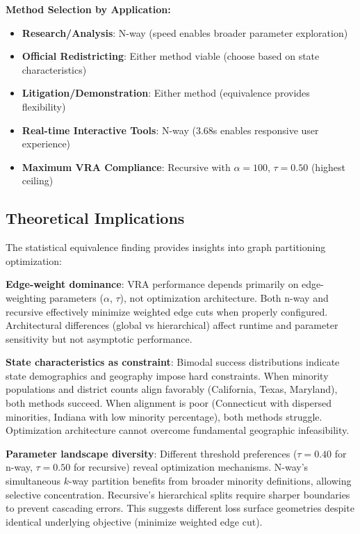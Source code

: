 \textbf{Method Selection by Application:}
\begin{itemize}
\item \textbf{Research/Analysis}: N-way (speed enables broader parameter exploration)
\item \textbf{Official Redistricting}: Either method viable (choose based on state characteristics)
\item \textbf{Litigation/Demonstration}: Either method (equivalence provides flexibility)
\item \textbf{Real-time Interactive Tools}: N-way (3.68s enables responsive user experience)
\item \textbf{Maximum VRA Compliance}: Recursive with $\alpha=100$, $\tau=0.50$ (highest ceiling)
\end{itemize}

\subsection{Theoretical Implications}

The statistical equivalence finding provides insights into graph partitioning optimization:

\textbf{Edge-weight dominance}: VRA performance depends primarily on edge-weighting parameters ($\alpha$, $\tau$), not optimization architecture. Both n-way and recursive effectively minimize weighted edge cuts when properly configured. Architectural differences (global vs hierarchical) affect runtime and parameter sensitivity but not asymptotic performance.

\textbf{State characteristics as constraint}: Bimodal success distributions indicate state demographics and geography impose hard constraints. When minority populations and district counts align favorably (California, Texas, Maryland), both methods succeed. When alignment is poor (Connecticut with dispersed minorities, Indiana with low minority percentage), both methods struggle. Optimization architecture cannot overcome fundamental geographic infeasibility.

\textbf{Parameter landscape diversity}: Different threshold preferences ($\tau=0.40$ for n-way, $\tau=0.50$ for recursive) reveal optimization mechanisms. N-way's simultaneous $k$-way partition benefits from broader minority definitions, allowing selective concentration. Recursive's hierarchical splits require sharper boundaries to prevent cascading errors. This suggests different loss surface geometries despite identical underlying objective (minimize weighted edge cut).

